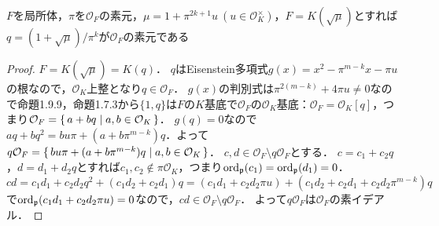 \begin{screen}
  $F$を局所体，$\pi$を$\mathcal{O}_F$の素元，$\mu=1+\pi^{2k+1}u\ (u\in\mathcal{O}_K^\times)$，$F=K(\sqrt{\mu})$とすれば$q=(1+\sqrt{\mu})/\pi^k$が$\mathcal{O}_F$の素元である
\end{screen}
\begin{proof}
  $F=K(\sqrt{\mu})=K(q)$．
  $q$はEisenstein多項式$g(x)=x^2-\pi^{m-k}x-\pi u$の根なので，$\mathcal{O}_K$上整となり$q\in\mathcal{O}_F$．
  $g(x)$の判別式は$\pi^{2(m-k)}+4\pi u\neq 0$なので命題1.9.9，命題1.7.3から$\{1,q\}$は$F$の$K$基底で$\mathcal{O}_F$の$\mathcal{O}_K$基底：$\mathcal{O}_F=\mathcal{O}_K[q]$，つまり$\mathcal{O}_F=\set{a+bq | a,b\in\mathcal{O}_K}$．
  $g(q)=0$なので$aq+bq^2=bu\pi+(a+b\pi^{m-k})q$．よって$q\mathcal{O}_F=\set{bu\pi+(a+b\pi^{m-k})q | a,b\in\mathcal{O}_K}$．
  $c,d\in\mathcal{O}_F\setminus q\mathcal{O}_F$とする．
  $c=c_1+c_2q$，$d=d_1+d_2q$とすれば$c_1,c_2\not\in\pi\mathcal{O}_K$，つまり$\operatorname{ord}_\mathfrak{p}(c_1)=\operatorname{ord}_\mathfrak{p}(d_1)=0$．
  \[cd=c_1d_1+c_2d_2q^2+(c_1d_2+c_2d_1)q=(c_1d_1+c_2d_2\pi u)+(c_1d_2+c_2d_1+c_2d_2\pi^{m-k})q\]
  で$\operatorname{ord}_\mathfrak{p}(c_1d_1+c_2d_2\pi u)=0$なので，$cd\in\mathcal{O}_F\setminus q\mathcal{O}_F$．
  よって$q\mathcal{O}_F$は$\mathcal{O}_F$の素イデアル．
\end{proof}
